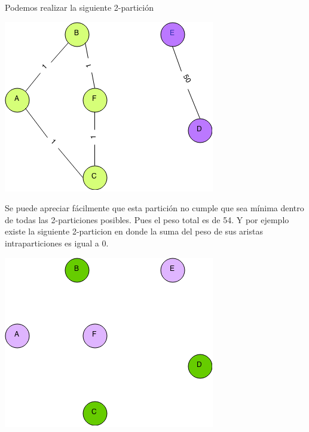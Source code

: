 Podemos realizar la siguiente 2-partici\'on 

\bc
		\includegraphics[scale=0.5]{img/kpmp1.png}
\ec

Se puede apreciar f\'acilmente que esta partici\'on no cumple que sea m\'inima dentro de todas las 2-particiones posibles. Pues el peso total es de 54. Y por ejemplo existe la siguiente 2-particion en donde la suma del peso de sus aristas intraparticiones es igual a 0.

\bc
		\includegraphics[scale=0.5]{img/kpmp2.png}
\ec